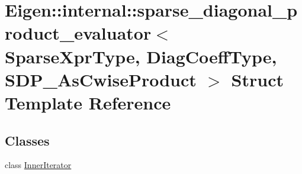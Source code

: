 \hypertarget{struct_eigen_1_1internal_1_1sparse__diagonal__product__evaluator_3_01_sparse_xpr_type_00_01_diag5c533b27b8fe485cf13e7ad699b99003}{}\section{Eigen\+:\+:internal\+:\+:sparse\+\_\+diagonal\+\_\+product\+\_\+evaluator$<$ Sparse\+Xpr\+Type, Diag\+Coeff\+Type, S\+D\+P\+\_\+\+As\+Cwise\+Product $>$ Struct Template Reference}
\label{struct_eigen_1_1internal_1_1sparse__diagonal__product__evaluator_3_01_sparse_xpr_type_00_01_diag5c533b27b8fe485cf13e7ad699b99003}
\subsection*{Classes}
\begin{DoxyCompactItemize}
\item 
class \hyperlink{class_eigen_1_1internal_1_1sparse__diagonal__product__evaluator_3_01_sparse_xpr_type_00_01_diag_f44167c623880e382ac76ec71f78299c}{Inner\+Iterator}
\end{DoxyCompactItemize}
